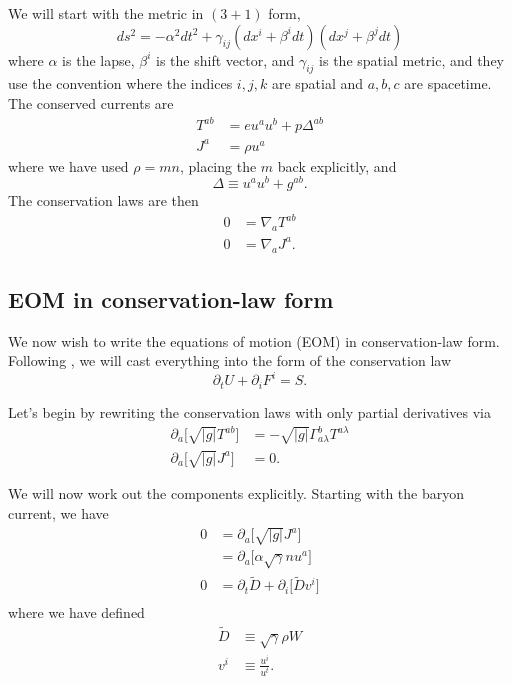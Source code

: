 \documentclass[12pt]{article}
\numberwithin{equation}{section}
\begin{document}
We will start with the metric in $(3+1)$ form,
\begin{equation}
ds^2 = - \alpha^2 dt^2 + \gamma_{ij} (dx^i + \beta^i dt) (dx^j + \beta^j dt)
\end{equation}
where $\alpha$ is the lapse, $\beta^{i}$ is the shift vector, and $\gamma_{ij}$
is the spatial metric, and they use the convention where the indices $i,j,k$
are spatial and $a,b,c$ are spacetime.
The conserved currents are
\begin{align}
T^{ab} &= e u^a u^b + p \Delta^{ab} \\
J^{a} &= \rho u^a
\end{align}
where we have used $\rho = m n$, placing the $m$ back explicitly, and
\begin{equation}
\Delta \equiv u^a u^b + g^{ab}.
\end{equation}
The conservation laws are then
\begin{align}
0 &= \nabla_{a} T^{ab} \\
0 &= \nabla_{a} J^{a}.
\end{align}

\subsection{EOM in conservation-law form}

We now wish to write the equations of motion (EOM) in conservation-law form.
Following \cite{BaumgarteShapiro}, we will cast everything into the form of the conservation law
\begin{equation}
\partial_t U + \partial_i F^{i} = S.
\end{equation}

Let's begin by rewriting the conservation laws with only partial derivatives via
\begin{align}
\partial_a \big[ \sqrt{|g|} T^{ab} \big] &= -\sqrt{|g|} \Gamma^{b}_{a \lambda} T^{a \lambda} \\
\partial_a \big[ \sqrt{|g|} J^{a} \big] &= 0.
\end{align}

We will now work out the components explicitly.
Starting with the baryon current, we have
\begin{equation}
\begin{aligned}
0 &= \partial_a \big[ \sqrt{|g|} J^{a} \big] \\
&= \partial_a \big[ \alpha \sqrt{\gamma} n u^a \big] \\
0 &= \partial_t \tilde{D} + \partial_i \big[ \tilde{D} v^i \big] \\
\end{aligned}
\end{equation}
where we have defined
\begin{equation}
\begin{aligned}
\tilde{D} &\equiv \sqrt{\gamma} \rho W \\
v^{i} &\equiv \frac{u^i}{u^t}.
\end{aligned}
\end{equation}
\end{document}
